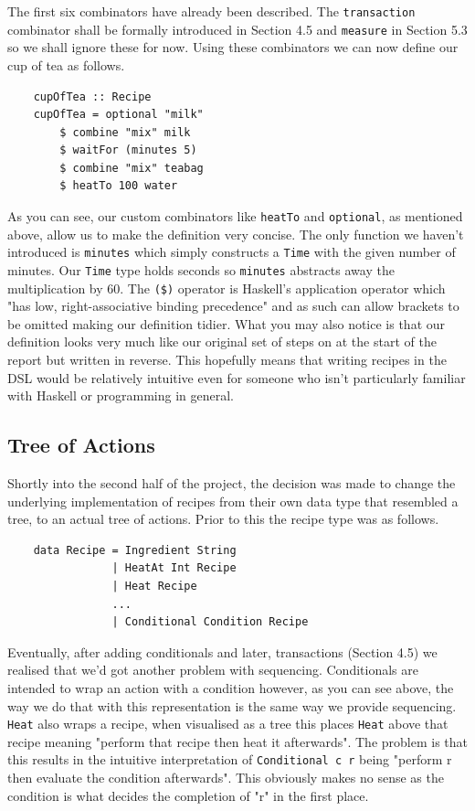 \documentclass[11pt]{article}
\begin{document}
The first six combinators have already been described. The \texttt{transaction} combinator
shall be formally introduced in Section 4.5 and \texttt{measure} in Section 5.3 so we shall
ignore these for now. Using these combinators we can now define our cup of tea as follows.

\begin{lstlisting}
    cupOfTea :: Recipe
    cupOfTea = optional "milk"
        $ combine "mix" milk
        $ waitFor (minutes 5)
        $ combine "mix" teabag
        $ heatTo 100 water
\end{lstlisting}

As you can see, our custom combinators like \texttt{heatTo} and \texttt{optional},
as mentioned above, allow us to make the definition very concise. The only function
we haven't introduced is \texttt{minutes} which simply constructs a \texttt{Time} with
the given number of minutes. Our \texttt{Time} type holds seconds so \texttt{minutes}
abstracts away the multiplication by 60. The \texttt{(\$)} operator is Haskell's
application operator which "has low, right-associative binding precedence"\cite{haskell-docs} and
as such can allow brackets to be omitted making our definition tidier. What you may
also notice is that our definition looks very much like our original set of steps
on at the start of the report but written in reverse. This hopefully means that
writing recipes in the DSL would be relatively intuitive even for someone who
isn't particularly familiar with Haskell or programming in general.

\subsection{Tree of Actions}

Shortly into the second half of the project, the decision was made to change the underlying
implementation of recipes from their own data type that resembled a tree, to an actual tree
of actions. Prior to this the recipe type was as follows.

\begin{lstlisting}
    data Recipe = Ingredient String
                | HeatAt Int Recipe
                | Heat Recipe
                ...
                | Conditional Condition Recipe
\end{lstlisting}

Eventually, after adding conditionals and later, transactions (Section 4.5) we realised that
we'd got another problem with sequencing. Conditionals are intended to wrap an action with
a condition however, as you can see above, the way we do that with this representation is the
same way we provide sequencing. \texttt{Heat} also wraps a recipe, when visualised as a tree
this places \texttt{Heat} above that recipe meaning "perform that recipe then heat it afterwards".
The problem is that this results in the intuitive interpretation of \texttt{Conditional c r}
being "perform r then evaluate the condition afterwards". This obviously makes no sense as the
condition is what decides the completion of "r" in the first place.
\end{document}
